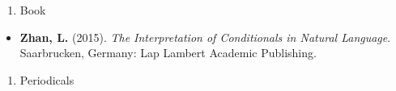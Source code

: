 \documentclass[12pt,]{article}
\providecommand{\tightlist}{%
  \setlength{\itemsep}{0pt}\setlength{\parskip}{0pt}}
\begin{document}
\begin{enumerate}
\def\labelenumi{\arabic{enumi}.}
\tightlist
\item
  Book
\end{enumerate}

\begin{itemize}
\tightlist
\item
  \textbf{Zhan, L.} (2015). \emph{The Interpretation of Conditionals in
  Natural Language}. Saarbrucken, Germany: Lap Lambert Academic
  Publishing.
\end{itemize}

\begin{enumerate}
\def\labelenumi{\arabic{enumi}.}
\setcounter{enumi}{1}
\tightlist
\item
  Periodicals
\end{enumerate}
\end{document}
